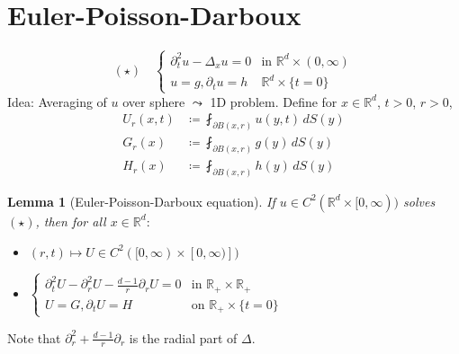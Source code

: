\documentclass{report}
\theoremstyle{tommy}
\newtheorem{lem}[defn]{Lemma}
\begin{document}
  \section{Euler-Poisson-Darboux}
  \[(\star) \quad \begin{cases}
    \partial_t^2 u - \Delta_x u = 0 &\text{in } \mathbb{R}^d \times (0,\infty) \\
    u = g, \partial_t u = h &\mathbb{R}^d \times \{t = 0\}
  \end{cases}\]
  Idea: Averaging of \(u\) over sphere \(\leadsto\) 1D problem.
  Define for \(x \in \mathbb{R}^d\), \(t > 0\), \(r > 0\),
  \begin{align*}
    U_r(x,t) &\coloneqq \fint_{\partial B(x,r)} u(y,t) \, dS(y) \\
    G_r(x) &\coloneqq \fint_{\partial B(x,r)} g(y) \, dS(y) \\
    H_r(x) &\coloneqq \fint_{\partial B(x,r)} h(y) \, dS(y)
  \end{align*}

  \begin{lem}[Euler-Poisson-Darboux equation]
    If \(u \in C^2(\mathbb{R}^d \times [0,\infty))\) solves \((\star)\), then for all \(x \in \mathbb{R}^d:\)
    \begin{itemize}
      \item \((r,t) \mapsto U \in C^2([0,\infty) \times [0,\infty)])\)
      \item \(\begin{cases}
        \partial_t^2 U - \partial_r^2 U - \frac{d-1}{r}\partial_r U = 0 &\text{in } \mathbb{R}_+ \times \mathbb{R}_+ \\
        U = G, \partial_t U = H &\text{on }\mathbb{R}_+ \times \{t=0\}
         \end{cases}\)
    \end{itemize}
  \end{lem}

  Note that \(\partial_r^2 + \frac{d-1}{r}\partial_r\) is the radial part of \(\Delta\).
\end{document}
